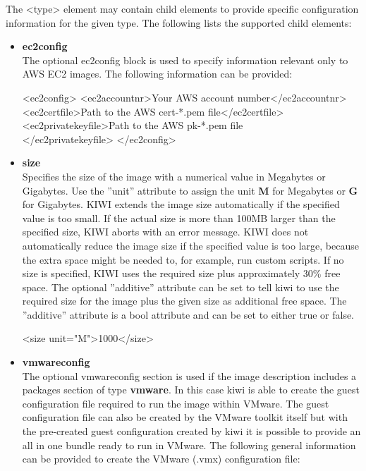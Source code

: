 The <type> element may contain child elements to provide specific
configuration information for the given type. The following lists the 
supported child elements:

\begin{itemize}
\item \textbf{ec2config}\\
    The optional ec2config block is used to specify information relevant
    only to AWS EC2 images. The following information can be provided:

    \begin{Command}{12cm}
    <ec2config>
    \hspace*{1cm}<ec2accountnr>Your AWS account number</ec2accountnr>
    \hspace*{1cm}<ec2certfile>Path to the AWS cert-*.pem file</ec2certfile>
    \hspace*{1cm}<ec2privatekeyfile>Path to the AWS pk-*.pem file\\
       </ec2privatekeyfile>
    </ec2config>
    \end{Command}

\item \textbf{size}\\
    Specifies the size of the image with a numerical value in
    Megabytes or Gigabytes. Use the ''unit'' attribute to assign the
    unit \textbf{M} for Megabytes or \textbf{G} for Gigabytes.
    KIWI extends the image size automatically if the specified value
    is too small. If the actual size is more than 100MB larger than
    the specified size, KIWI aborts with an error
    message. KIWI does not automatically reduce the image size if
    the specified value is too large, because the extra space might
    be needed to, for example, run custom scripts. If no size is
    specified, KIWI uses the required size plus approximately
    30\% free space. The optional ''additive'' attribute can be set
    to tell kiwi to use the required size for the image plus the
    given size as additional free space. The ''additive'' attribute is
    a bool attribute and can be set to either true or false.

	\begin{Command}{12cm}
	<size unit="M">1000</size>
	\end{Command}

\item \textbf{vmwareconfig}\\
	The optional vmwareconfig section is used if the image description
	includes a packages section of type \textbf{vmware}. In this case kiwi
	is able to create the guest configuration file required to run the
	image within VMware. The guest configuration file can also be created
	by the VMware toolkit itself but with the pre-created guest configuration
	created by kiwi it is possible to provide an all in one bundle ready
	to run in VMware. The following general information can be provided to
	create the VMware (.vmx) configuration file:


\end{itemize}
